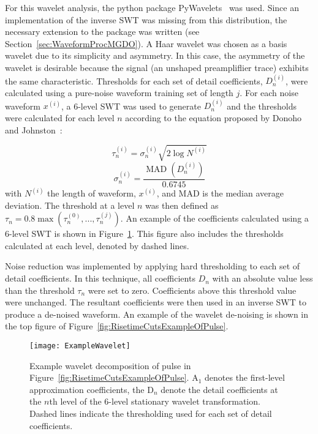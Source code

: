 	For this wavelet analysis, the python package PyWavelets~\cite{PyWave} was used.  Since an implementation of the inverse SWT was missing from this distribution, the necessary extension to the package was written (see Section~\ref{sec:WaveformProcMGDO}).  A Haar wavelet was chosen as a basis wavelet due to its simplicity and asymmetry.  In this case, the asymmetry of the wavelet is desirable because the signal (an unshaped preampliflier trace) exhibits the same characteristic.  Thresholds for each set of detail coefficients, $D_{n}^{(i)}$, were calculated using a pure-noise waveform training set of length $j$.  For each noise waveform $x^{(i)}$, a 6-level SWT was used to generate $D_{n}^{(i)}$ and the thresholds were calculated for each level $n$ according to the equation proposed by Donoho and Johnston~\cite{Don95ad}:
	
				\begin{equation}			
					\tau_{n}^{(i)} = \sigma_{n}^{(i)} \sqrt{2 \log N^{(i)}}
				\end{equation}			
				\[
					\sigma_{n}^{(i)} = \frac{\operatorname{MAD}\left(D_{n}^{(i)}\right)}{0.6745}
				\]
with $N^{(i)}$ the length of waveform, $x^{(i)}$, and MAD is the median average deviation.  The threshold at a level $n$ was then defined as $\tau_{n} = 0.8 \max(\tau_{n}^{(0)},...,\tau_{n}^{(j)})$.  An example of the coefficients calculated using a 6-level SWT is shown in Figure~\ref{fig:RisetimeCutsWaveletDecompositionOfPulse}.  This figure also includes the thresholds calculated at each level, denoted by dashed lines.  

Noise reduction was implemented by applying hard thresholding to each set of detail coefficients.  In this technique, all coefficients $D_{n}$ with an absolute value less than the threshold $\tau_{n}$ were set to zero.  Coefficients above this threshold value were unchanged.  The resultant coefficients were then used in an inverse SWT to produce a de-noised waveform.  An example of the wavelet de-noising is shown in the top figure of Figure~\ref{fig:RisetimeCutsExampleOfPulse}.
	
			
				\begin{figure}
					\centering
					\texttt{[image: ExampleWavelet]}
					\caption[Example wavelet decomposition of pulse]
					{Example wavelet decomposition of pulse in Figure~\ref{fig:RisetimeCutsExampleOfPulse}.  
					A$_{1}$ denotes the first-level
					 approximation coefficients, the D$_{n}$ denote the detail coefficients at the $n$th level of the 6-level stationary wavelet 
					 transformation.  Dashed lines indicate the thresholding used for each set of detail coefficients.}
					\label{fig:RisetimeCutsWaveletDecompositionOfPulse}
				\end{figure}					

